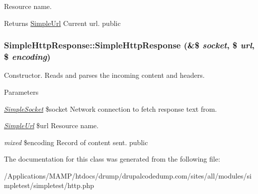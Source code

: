 \label{class_simple_http_response_a2241dc18405a1f831af92943df1104ed}
Resource name. \begin{DoxyReturn}{Returns}
\hyperlink{class_simple_url}{SimpleUrl} Current url.  public 
\end{DoxyReturn}
\hypertarget{class_simple_http_response_a310e299fbb90b5943491ddf86bcd73dd}{
\subsubsection[{SimpleHttpResponse}]{\setlength{\rightskip}{0pt plus 5cm}SimpleHttpResponse::SimpleHttpResponse (\&\$ {\em socket}, \/  \$ {\em url}, \/  \$ {\em encoding})}}
\label{class_simple_http_response_a310e299fbb90b5943491ddf86bcd73dd}
Constructor. Reads and parses the incoming content and headers. 
\begin{DoxyParams}{Parameters}
\item[{\em \hyperlink{class_simple_socket}{SimpleSocket}}]\$socket Network connection to fetch response text from. \item[{\em \hyperlink{class_simple_url}{SimpleUrl}}]\$url Resource name. \item[{\em mixed}]\$encoding Record of content sent.  public \end{DoxyParams}


The documentation for this class was generated from the following file:\begin{DoxyCompactItemize}
\item 
/Applications/MAMP/htdocs/drump/drupalcodedump.com/sites/all/modules/simpletest/simpletest/http.php\end{DoxyCompactItemize}
